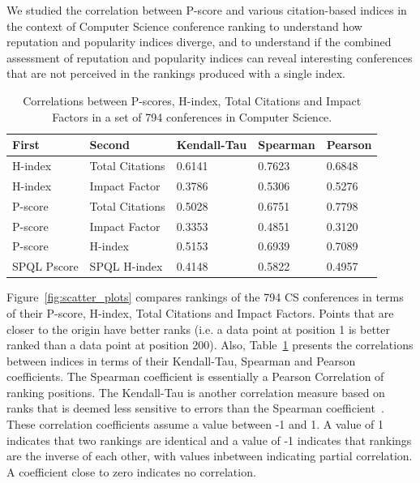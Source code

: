 \documentclass[notitlepage]{svjour3}
\begin{document}
We studied the correlation between P-score and various citation-based indices 
in the context of Computer Science conference ranking to understand how reputation
and popularity indices diverge, and to understand if the combined assessment of 
reputation and popularity indices can reveal interesting conferences that are
not perceived in the rankings produced with a single index.

\begin{table}[ht!]
  \small
  \centering
  \begin{tabular}{lllll} 
  \toprule
  First & Second & Kendall-Tau & Spearman & Pearson \\ 
  \midrule
  H-index     & Total Citations           & 0.6141 & 0.7623 & 0.6848 \\
  H-index     & Impact Factor             & 0.3786 & 0.5306 & 0.5276 \\ 		
  P-score     & Total Citations           & 0.5028 & 0.6751 & 0.7798 \\
  P-score     & Impact Factor             & 0.3353 & 0.4851 & 0.3120 \\ 		
  P-score     & H-index                   & 0.5153 & 0.6939 & 0.7089 \\
  SPQL Pscore & SPQL H-index              & 0.4148 & 0.5822 & 0.4957 \\
  \bottomrule
  \end{tabular}
  \caption{Correlations between P-scores, H-index, Total Citations 
  and Impact Factors in a set of 794 conferences in Computer Science.}
  \label{tab:correlations}
\end{table}

Figure~\ref{fig:scatter_plots} compares rankings of the 794 CS conferences in terms of their
P-score, H-index, Total Citations and Impact Factors.
Points that are closer to the origin have better ranks (i.e. a data point at position 1 is 
better ranked than a data point at position 200). Also, Table~\ref{tab:correlations} presents the
correlations between indices in terms of their Kendall-Tau, Spearman and Pearson coefficients.
The Spearman coefficient is essentially a Pearson Correlation of ranking positions. The
Kendall-Tau is another correlation measure based on ranks that is deemed less
sensitive to errors than the Spearman coefficient~\cite{Kendall1955,Baeza-Yates2011}. These 
correlation coefficients assume a value between -1 and 1. A value of 1 indicates that two rankings are 
identical and a value of -1 indicates that rankings are the inverse of each other, with values 
inbetween indicating partial correlation. A coefficient close to zero indicates no correlation.
\end{document}
